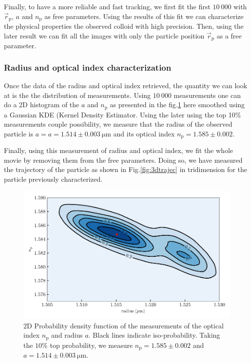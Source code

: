  
 Finally, to have a more reliable and fast tracking, we first fit the first $10~000$ with  $\vec{r}_\mathrm{p}$, $a$ and $n_\mathrm{p}$ as free parameters. Using the results of this fit we can characterize the physical properties the observed colloid with high precision. Then, using the later result we can fit all the images with only the particle position $\vec{r}_\mathrm{p}	$ as a free parameter.
 



\subsubsection{Radius and optical index characterization}


Once the data of the radius and optical index retrieved, the quantity we can look at is the the distribution of measurements. Using $10 ~ 000$ measurements one can do a 2D histogram of the $a$ and $n_\mathrm{p}$ as presented in the fig.\ref{fig:KDErn} here smoothed using a Gaussian KDE (Kernel Density Estimator. Using the later using the top 10\% measurements couple possibility, we measure that the radius of the observed particle is $a = a=1.514 \pm 0.003 ~ \mathrm{\mu m} $ and its optical index $n_\mathrm{p} = 1.585 \pm 0.002$.
 




Finally, using this measurement of radius and optical index, we fit the whole movie by removing them from the free parameters. Doing so, we have measured the trajectory of the particle as shown in Fig.\ref{fig:3dtrajec} in tridimension for the particle previously characterized.

\begin{figure}[!ht]
	\centering
	\includegraphics{02_body/chapter2/images/KDErn.pdf}
	\caption{2D Probability density function of the measurements of the optical index $n_\mathrm{p}$ and radius $a$. Black lines indicate iso-probability. Taking the $10\% $ top probability, we measure $n_\mathrm{p} = 1.585 \pm 0.002$ and $a=1.514 \pm 0.003 ~ \mathrm{\mu m}$. }
	\label{fig:KDErn}
\end{figure}

